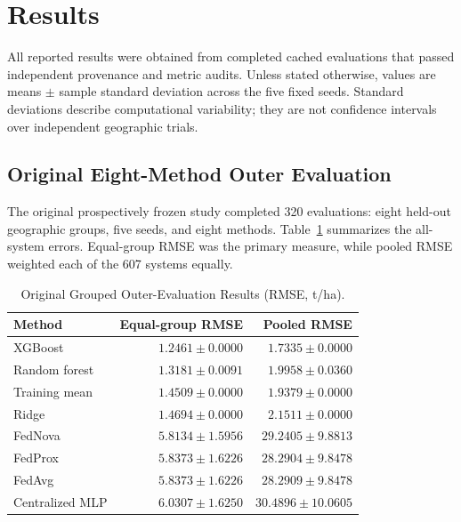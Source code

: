 \documentclass[journal]{IEEEtran}
\begin{document}
\section{Results}

All reported results were obtained from completed cached evaluations that passed
independent provenance and metric audits. Unless stated otherwise, values are
means $\pm$ sample standard deviation across the five fixed seeds. Standard
deviations describe computational variability; they are not confidence intervals
over independent geographic trials.

\subsection{Original Eight-Method Outer Evaluation}

The original prospectively frozen study completed 320 evaluations: eight
held-out geographic groups, five seeds, and eight methods. Table~\ref{tab:orig}
summarizes the all-system errors. Equal-group RMSE was the primary measure,
while pooled RMSE weighted each of the 607 systems equally.

\begin{table}[htbp]
\caption{Original Grouped Outer-Evaluation Results (RMSE, t/ha).}
\label{tab:orig}
\centering
\begin{tabular}{lrr}
\toprule
Method & Equal-group RMSE & Pooled RMSE \\
\midrule
XGBoost             & $1.2461 \pm 0.0000$ & $1.7335 \pm 0.0000$ \\
Random forest       & $1.3181 \pm 0.0091$ & $1.9958 \pm 0.0360$ \\
Training mean       & $1.4509 \pm 0.0000$ & $1.9379 \pm 0.0000$ \\
Ridge               & $1.4694 \pm 0.0000$ & $2.1511 \pm 0.0000$ \\
FedNova             & $5.8134 \pm 1.5956$ & $29.2405 \pm 9.8813$ \\
FedProx             & $5.8373 \pm 1.6226$ & $28.2904 \pm 9.8478$ \\
FedAvg              & $5.8373 \pm 1.6226$ & $28.2909 \pm 9.8478$ \\
Centralized MLP     & $6.0307 \pm 1.6250$ & $30.4896 \pm 10.0605$ \\
\bottomrule
\end{tabular}
\end{table}
\end{document}
